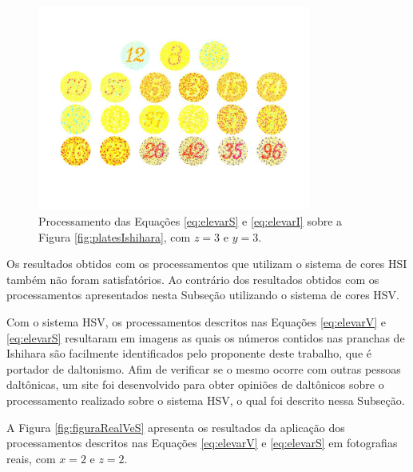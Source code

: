 \documentclass[	12pt, Times, openright, twoside, a4paper, english, brazil]{abntex2}
\begin{document}
\begin{figure}[!htb]
\centering \includegraphics[width=0.80\textwidth]{figuraElevarSeI.jpg}
\caption{Processamento das Equações \ref{eq:elevarS} e \ref{eq:elevarI} sobre a Figura \ref{fig:platesIshihara}, com $z = 3$ e $y = 3$. \label{fig:figuraElevarSeI}}
\end{figure}

Os resultados obtidos com os processamentos que utilizam o sistema de cores HSI também não foram satisfatórios. Ao contrário dos resultados obtidos com os processamentos apresentados nesta Subseção utilizando o sistema de cores HSV.

Com o sistema HSV, os processamentos descritos nas Equações \ref{eq:elevarV} e \ref{eq:elevarS} resultaram em imagens as quais os números contidos nas pranchas de Ishihara são facilmente identificados pelo proponente deste trabalho, que é portador de daltonismo. Afim de verificar se o mesmo ocorre com outras pessoas daltônicas, um site foi desenvolvido para obter opiniões de daltônicos sobre o processamento realizado sobre o sistema HSV, o qual foi descrito nessa Subseção.

A Figura \ref{fig:figuraRealVeS} apresenta os resultados da aplicação dos processamentos descritos nas Equações \ref{eq:elevarV} e \ref{eq:elevarS} em fotografias reais, com $x = 2$ e $z = 2$.
\end{document}
